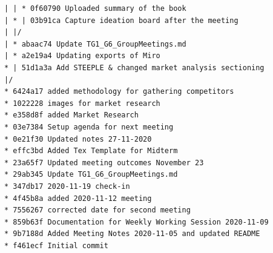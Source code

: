 \begin{verbatim}
| | * 0f60790 Uploaded summary of the book
| * | 03b91ca Capture ideation board after the meeting
| |/
| * abaac74 Update TG1_G6_GroupMeetings.md
| * a2e19a4 Updating exports of Miro
* | 51d1a3a Add STEEPLE & changed market analysis sectioning
|/
* 6424a17 added methodology for gathering competitors
* 1022228 images for market research
* e358d8f added Market Research
* 03e7384 Setup agenda for next meeting
* 0e21f30 Updated notes 27-11-2020
* effc3bd Added Tex Template for Midterm
* 23a65f7 Updated meeting outcomes November 23
* 29ab345 Update TG1_G6_GroupMeetings.md
* 347db17 2020-11-19 check-in
* 4f45b8a added 2020-11-12 meeting
* 7556267 corrected date for second meeting
* 859b63f Documentation for Weekly Working Session 2020-11-09
* 9b7188d Added Meeting Notes 2020-11-05 and updated README
* f461ecf Initial commit
\end{verbatim}


